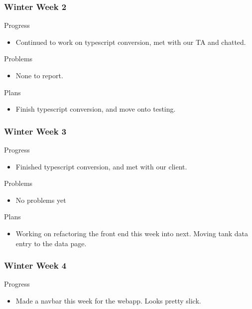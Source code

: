     \subsubsection{Winter Week 2}
        \noindent
        Progress
        \begin{itemize}
            \item Continued to work on typescript conversion, met with our TA and chatted. 
        \end{itemize}
        
        \noindent
        Problems
        \begin{itemize}
            \item None to report.
        \end{itemize}
        
        \noindent
        Plans
        \begin{itemize}
            \item Finish typescript conversion, and move onto testing. 
        \end{itemize}
    \subsubsection{Winter Week 3}
        \noindent
        Progress
        \begin{itemize}
            \item Finished typescript conversion, and met with our client.
        \end{itemize}
        
        \noindent
        Problems
        \begin{itemize}
            \item No problems yet
        \end{itemize}
        
        \noindent
        Plans
        \begin{itemize}
            \item Working on refactoring the front end this week into next. Moving tank data entry to the data page.
        \end{itemize}
    \subsubsection{Winter Week 4}
        \noindent
        Progress
        \begin{itemize}
            \item  Made a navbar this week for the webapp. Looks pretty slick.
        \end{itemize}
        
